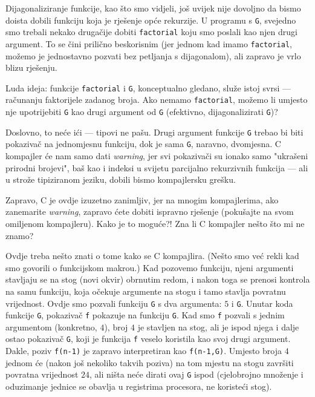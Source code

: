 
Dijagonaliziranje funkcije, kao što smo vidjeli, još uvijek nije dovoljno da bismo doista dobili funkciju koja je rješenje opće rekurzije. U programu s \texttt{G}, svejedno smo trebali nekako drugačije dobiti \texttt{factorial} koju smo poslali kao njen drugi argument. To se čini prilično beskorisnim (jer jednom kad imamo \texttt{factorial}, možemo je jednostavno pozvati bez petljanja s dijagonalom), ali zapravo je vrlo blizu rješenju.

Luda ideja: funkcije \texttt{factorial} i \texttt{G}, konceptualno gledano, služe istoj svrsi --- računanju faktorijele zadanog broja. Ako nemamo \texttt{factorial}, možemo li umjesto nje upotrijebiti \texttt{G} kao drugi argument od \texttt{G} (efektivno, dijagonalizirati \texttt G)?

Doslovno, to neće ići --- tipovi ne pašu. Drugi argument funkcije \texttt{G} trebao bi biti pokazivač na jednomjesnu funkciju, dok je sama \texttt{G}, naravno, dvomjesna. C kompajler će nam samo dati \emph{warning}, jer svi pokazivači su ionako samo "ukrašeni prirodni brojevi", baš kao i indeksi u svijetu parcijalno rekurzivnih funkcija --- ali u strože tipiziranom jeziku, dobili bismo kompajlersku grešku.

Zapravo, C je ovdje izuzetno zanimljiv, jer na mnogim kompajlerima, ako zanemarite \emph{warning}, zapravo ćete dobiti ispravno rješenje (pokušajte na svom omiljenom kompajleru). Kako je to moguće?! Zna li C kompajler nešto što mi ne znamo?

Ovdje treba nešto znati o tome kako se C kompajlira. (Nešto smo već rekli kad smo govorili o funkcijskom makrou.) Kad pozovemo funkciju, njeni argumenti stavljaju se na stog (novi okvir) obrnutim redom, i nakon toga se prenosi kontrola na samu funkciju, koja očekuje argumente na stogu i tamo stavlja povratnu vrijednost. Ovdje smo pozvali funkciju \texttt{G} s dva argumenta: $5$ i \texttt{G}. Unutar koda funkcije \texttt{G}, pokazivač \texttt f pokazuje na funkciju \texttt{G}. Kad smo \texttt f pozvali s jednim argumentom (konkretno, $4$), broj $4$ je stavljen na stog, ali je ispod njega i dalje ostao pokazivač \texttt{G}, koji je funkcija \texttt f veselo koristila kao svoj drugi argument. Dakle, poziv \texttt{f(n-1)} je zapravo interpretiran kao \texttt{f(n-1,G)}. Umjesto broja $4$ jednom će (nakon još nekoliko takvih poziva) na tom mjestu na stogu završiti povratna vrijednost $24$, ali ništa neće dirati ovaj \texttt{G} ispod (cjelobrojno množenje i oduzimanje jednice se obavlja u registrima procesora, ne koristeći stog).

